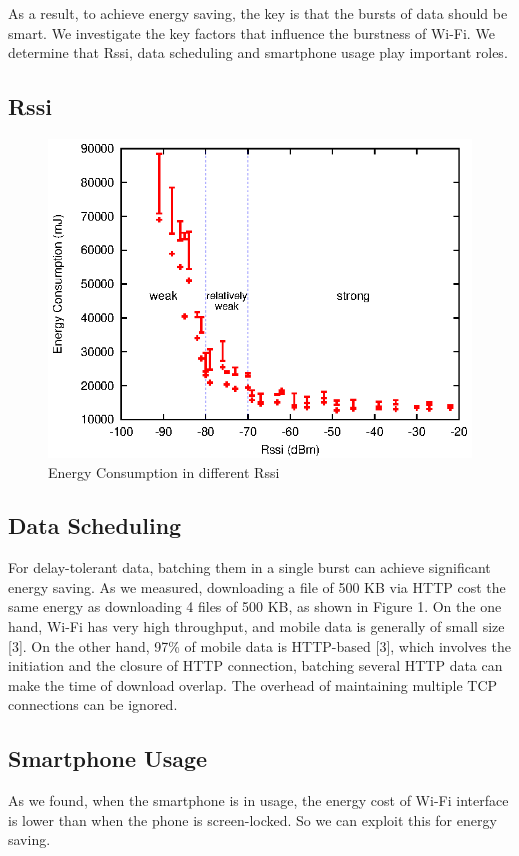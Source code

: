\documentclass[journal]{IEEEtran}
\begin{document}
As a result, to achieve energy saving, the key is that the bursts of data should be smart.
We investigate the key factors that influence the burstness of Wi-Fi. 
We determine that Rssi, data scheduling and smartphone usage play important roles.
\subsection{Rssi}

\begin{figure}
\centering
\includegraphics[scale=0.95]{rssi_energy.eps}
\caption{Energy Consumption in different Rssi}
\label{rssi_energy}
\end{figure}

\subsection{Data Scheduling}
For delay-tolerant data, batching them in a single burst can achieve significant energy saving. 
As we measured, downloading a file of 500 KB via HTTP cost the same energy as downloading 
4 files of 500 KB, as shown in Figure 1. On the one hand, Wi-Fi has very high throughput, and mobile data is generally of 
small size [3]. On the other hand, 97\% of mobile data is HTTP-based [3], 
which involves the initiation and the closure of HTTP connection, batching several 
HTTP data can make the time of download overlap. The overhead of maintaining multiple TCP connections
can be ignored.
\subsection{Smartphone Usage}
As we found, when the smartphone is in usage, the energy cost of Wi-Fi interface is lower than when the phone 
is screen-locked. So we can exploit this for energy saving.
\end{document}
